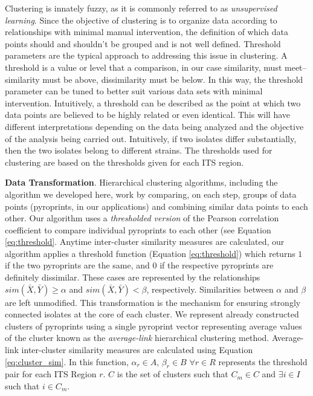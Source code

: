 \documentclass[12pt]{ucthesis}
\begin{document}
      Clustering is innately fuzzy, as it is commonly referred to as
      \textit{unsupervised learning}. Since the objective of clustering is to
      organize data according to relationships with minimal manual
      intervention, the definition of which data points should and shouldn't be
      grouped and is not well defined. Threshold parameters are the typical
      approach to addressing this issue in clustering. A threshold is a value
      or level that a comparison, in our case similarity, must meet--similarity
      must be above, dissimilarity must be below. In this way, the threshold
      parameter can be tuned to better suit various data sets with minimal
      intervention. Intuitively, a threshold can be described as the point at
      which two data points are believed to be highly related or even
      identical. This will have different interpretations depending on the data
      being analyzed and the objective of the analysis being carried out.
      Intuitively, if two isolates differ substantially, then the two isolates
      belong to different strains. The thresholds used for clustering are based
      on the thresholds given for each ITS region.
   
      \textbf{Data Transformation}. Hierarchical clustering algorithms, including the
      algorithm we developed here, work by comparing, on each step, groups of data
      points (pyroprints, in our applications) and combining similar data points to
      each other. Our algorithm uses a \textit{thresholded version} of the Pearson
      correlation coefficient to compare individual pyroprints to each other (see
      Equation \ref{eq:threshold}. Anytime inter-cluster similarity measures are
      calculated, our algorithm applies a threshold function (Equation
      \ref{eq:threshold}) which returns $1$ if the two pyroprints are the same, and
      $0$ if the respective pyroprints are definitely dissimilar. These cases are
      represented by the relationships $sim(\bar{X}, \bar{Y}) \ge \alpha$ and
      $sim(\bar{X}, \bar{Y}) < \beta$, respectively. Similarities between $\alpha$ and
      $\beta$ are left unmodified. This transformation is the mechanism for ensuring
      strongly connected isolates at the core of each cluster. We represent already
      constructed clusters of pyroprints using a single pyroprint vector representing
      average values of the cluster known as the \textit{average-link} hierarchical
      clustering method. Average-link inter-cluster similarity measures are
      calculated using Equation \ref{eq:cluster_sim}. In this function, $\alpha_r \in
      A$, $\beta_r \in B$ $\forall r \in R$ represents the threshold pair for each
      ITS Region $r$. $C$ is the set of clusters such that $C_m \in C$ and $\exists i
      \in I$ such that $i \in C_m$.
\end{document}

